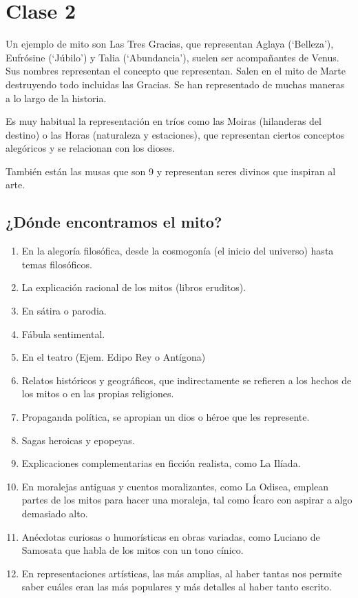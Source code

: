 \chapter{Clase 2}\label{ch:clase2}
Un ejemplo de mito son Las Tres Gracias, que representan Aglaya (‘Belleza’), Eufrósine (‘Júbilo’) y Talia (‘Abundancia’), suelen ser acompañantes de Venus. Sus nombres representan el concepto que representan. Salen en el mito de Marte destruyendo todo incluidas las Gracias. Se han representado de muchas maneras a lo largo de la historia.

Es muy habitual la representación en tríos como las Moiras (hilanderas del destino) o las Horas (naturaleza y estaciones), que representan ciertos conceptos alegóricos y se relacionan con los dioses.

También están las musas que son 9 y representan seres divinos que inspiran al arte.

\section{¿Dónde encontramos el mito?}
\begin{enumerate}
  \item En la alegoría filosófica, desde la cosmogonía (el inicio del universo) hasta temas filosóficos.
  \item La explicación racional de los mitos (libros eruditos).
  \item En sátira o parodia.
  \item Fábula sentimental.
  \item En el teatro (Ejem. Edipo Rey o Antígona)
  \item Relatos históricos y geográficos, que indirectamente se refieren a los hechos de los mitos o en las propias religiones.
  \item Propaganda política, se apropian un dios o héroe que les represente.
  \item Sagas heroicas y epopeyas.
  \item Explicaciones complementarias en ficción realista, como La Ilíada.
  \item En moralejas antiguas y cuentos moralizantes, como La Odisea, emplean partes de los mitos para hacer una moraleja, tal como Ícaro con aspirar a algo demasiado alto.
  \item Anécdotas curiosas o humorísticas en obras variadas, como Luciano de Samosata que habla de los mitos con un tono cínico.
  \item En representaciones artísticas, las más amplias, al haber tantas nos permite saber cuáles eran las más populares y más detalles al haber tanto escrito.
\end{enumerate}

